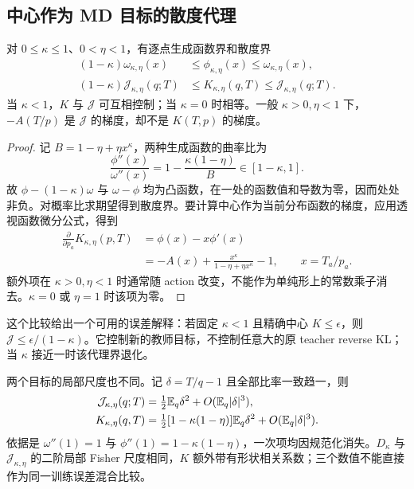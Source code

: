 \subsection{中心作为 MD 目标的散度代理}

\begin{theorem}
\label{thm:power-md-center-comparison}
对 $0\le\kappa\le1$、$0<\eta<1$，有逐点生成函数界和散度界
\begin{align}
 (1-\kappa)\omega_{\kappa,\eta}(x)
 &\le\phi_{\kappa,\eta}(x)\le\omega_{\kappa,\eta}(x),\\
 (1-\kappa)\mathcal J_{\kappa,\eta}(q;T)
 &\le K_{\kappa,\eta}(q,T)\le\mathcal J_{\kappa,\eta}(q;T).
 \label{eq:power-md-center-sandwich}
\end{align}
当 $\kappa<1$，$K$ 与 $\mathcal J$ 可互相控制；当 $\kappa=0$ 时相等。一般 $\kappa>0,\eta<1$ 下，$-A(T/p)$ 是 $\mathcal J$ 的梯度，却不是 $K(T,p)$ 的梯度。
\end{theorem}

\begin{proof}
记 $B=1-\eta+\eta x^\kappa$，两种生成函数的曲率比为
\begin{equation}
 \frac{\phi''(x)}{\omega''(x)}
 =1-\frac{\kappa(1-\eta)}B\in[1-\kappa,1].
\end{equation}
故 $\phi-(1-\kappa)\omega$ 与 $\omega-\phi$ 均为凸函数，在一处的函数值和导数为零，因而处处非负。对概率比求期望得到散度界。要计算中心作为当前分布函数的梯度，应用透视函数微分公式，得到
\begin{align}
 \frac\partial{\partial p_a}K_{\kappa,\eta}(p,T)
 &=\phi(x)-x\phi'(x)\\
 &=-A(x)+\frac{x^\kappa}{1-\eta+\eta x^\kappa}-1,
 \qquad x=T_a/p_a.
 \label{eq:power-md-center-gradient-difference}
\end{align}
额外项在 $\kappa>0,\eta<1$ 时通常随 action 改变，不能作为单纯形上的常数乘子消去。$\kappa=0$ 或 $\eta=1$ 时该项为零。
\end{proof}

这个比较给出一个可用的误差解释：若固定 $\kappa<1$ 且精确中心 $K\le\epsilon$，则 $\mathcal J\le\epsilon/(1-\kappa)$。它控制新的教师目标，不控制任意大的原 teacher reverse KL；当 $\kappa$ 接近一时该代理界退化。

两个目标的局部尺度也不同。记 $\delta=T/q-1$ 且全部比率一致趋一，则
\begin{align}
 \mathcal J_{\kappa,\eta}(q;T)
 &=\tfrac12\mathbb E_q\delta^2+O(\mathbb E_q|\delta|^3),\\
 K_{\kappa,\eta}(q,T)
 &=\tfrac12[1-\kappa(1-\eta)]\mathbb E_q\delta^2+O(\mathbb E_q|\delta|^3).
\end{align}
依据是 $\omega''(1)=1$ 与 $\phi''(1)=1-\kappa(1-\eta)$，一次项均因规范化消失。$D_\kappa$ 与 $\mathcal J_{\kappa,\eta}$ 的二阶局部 Fisher 尺度相同，$K$ 额外带有形状相关系数；三个数值不能直接作为同一训练误差混合比较。

